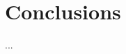 \documentclass{sigplanconf}
\begin{document}



\section{Conclusions}




\acks
...




\end{document}
